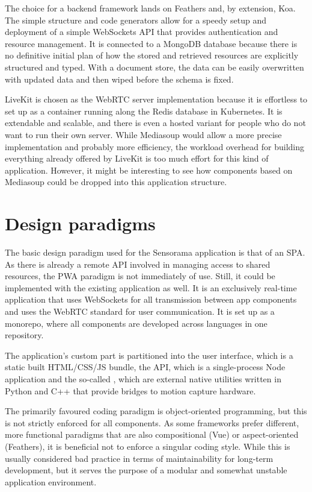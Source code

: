 The choice for a backend framework lands on Feathers and, by extension, Koa.
The simple structure and code generators allow for a speedy setup and deployment of a simple WebSockets \ac{API} that provides authentication and resource management.
It is connected to a MongoDB database because there is no definitive initial plan of how the stored and retrieved resources are explicitly structured and typed.
With a document store, the data can be easily overwritten with updated data and then wiped before the schema is fixed.

LiveKit is chosen as the WebRTC server implementation because it is effortless to set up as a container running along the Redis database in Kubernetes.
It is extendable and scalable, and there is even a hosted variant for people who do not want to run their own server.
While Mediasoup would allow a more precise implementation and probably more efficiency, the workload overhead for building everything already offered by LiveKit is too much effort for this kind of application.
However, it might be interesting to see how components based on Mediasoup could be dropped into this application structure.

\section{Design paradigms}
\label{sec:design-paradigms}

The basic design paradigm used for the Sensorama application is that of an \ac{SPA}.
As there is already a remote API involved in managing access to shared resources, the \ac{PWA} paradigm is not immediately of use.
Still, it could be implemented with the existing application as well.
It is an exclusively real-time application that uses WebSockets for all transmission between app components and uses the WebRTC standard for user communication.
It is set up as a monorepo, where all components are developed across languages in one repository.

The application's custom part is partitioned into the user interface, which is a static built \ac{HTML}/\ac{CSS}/\ac{JS} bundle, the \ac{API}, which is a single-process Node application and the so-called , which are external native utilities written in Python and C++ that provide bridges to motion capture hardware.

The primarily favoured coding paradigm is object-oriented programming, but this is not strictly enforced for all components.
As some frameworks prefer different, more functional paradigms that are also compositional (Vue) or aspect-oriented (Feathers), it is beneficial not to enforce a singular coding style.
While this is usually considered bad practice in terms of maintainability for long-term development, but it serves the purpose of a modular and somewhat unstable  application environment.

